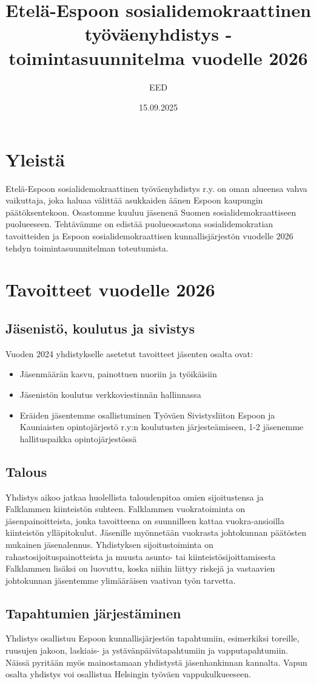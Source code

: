 \documentclass[a4paper,12pt]{article}
\title{Etelä-Espoon sosialidemokraattinen työväenyhdistys - toimintasuunnitelma vuodelle 2026}
\author{EED}
\date{15.09.2025}
\begin{document}
\maketitle
\section{Yleistä}
Etelä-Espoon sosialidemokraattinen työväenyhdistys r.y. on oman alueensa vahva vaikuttaja, joka haluaa välittää asukkaiden äänen Espoon kaupungin päätöksentekoon. Osastomme kuuluu jäsenenä Suomen sosialidemokraattiseen puolueeseen. Tehtävämme on edistää puolueosastona sosialidemokratian tavoitteiden ja Espoon sosialidemokraattisen kunnallisjärjestön vuodelle 2026 tehdyn toimintasuunnitelman toteutumista.
\section{Tavoitteet vuodelle 2026}
\subsection{Jäsenistö, koulutus ja sivistys}
Vuoden 2024 yhdistykselle asetetut tavoitteet jäsenten osalta ovat:
\begin{itemize}
\item{Jäsenmäärän kasvu, painottuen nuoriin ja työikäisiin}
\item{Jäsenistön koulutus verkkoviestinnän hallinnassa}
\item{Eräiden jäsentemme osallistuminen Työväen Sivistysliiton Espoon ja Kauniaisten opintojärjestö r.y:n koulutusten järjesteämiseen, 1-2 jäsenemme hallituspaikka opintojärjestössä}
\end{itemize}
\subsection{Talous}
Yhdistys aikoo jatkaa huolellista taloudenpitoa omien sijoitustensa ja Falklammen kiinteistön suhteen. Falklammen vuokratoiminta on jäsenpainoitteista, jonka tavoitteena on suunnilleen kattaa vuokra-ansioilla kiinteistön ylläpitokulut. Jäsenille myönnetään vuokrasta johtokunnan päätösten mukainen jäsenalennus. Yhdistyksen sijoitustoiminta on rahastosijoituspainotteista ja muusta asunto- tai kiinteistösijoittamisesta Falklammen lisäksi on luovuttu, koska niihin liittyy riskejä ja vastaavien johtokunnan jäsentemme ylimääräisen vaativan työn tarvetta.
\subsection{Tapahtumien järjestäminen}
Yhdistys osallistuu Espoon kunnallisjärjestön tapahtumiin, esimerkiksi toreille, ruusujen jakoon, laskiais- ja ystävänpäivätapahtumiin ja vapputapahtumiin. Näissä pyritään myös mainostamaan yhdistystä jäsenhankinnan kannalta. Vapun osalta yhdistys voi osallistua Helsingin työväen vappukulkueeseen.
\end{document}
